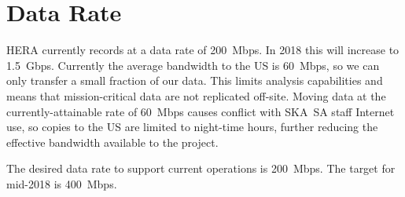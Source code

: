 \documentclass{article}
\begin{document}
\section{Data Rate}
HERA currently records at a data rate of 200~Mbps. In 2018 this will increase to 1.5~Gbps. Currently the average bandwidth to the US is 60~Mbps, so we can only transfer a small fraction of our data. This limits analysis capabilities and means that mission-critical data are not replicated off-site. Moving data at the currently-attainable rate of 60~Mbps causes conflict with SKA~SA staff Internet use, so copies to the US are limited to night-time hours, further reducing the effective bandwidth available to the project.

The desired data rate to support current operations is 200~Mbps. The target for mid-2018 is 400~Mbps.
\end{document}
